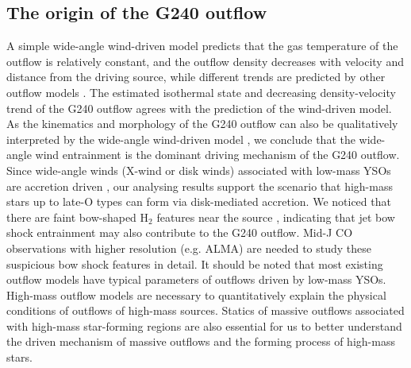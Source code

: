 
\subsection{The origin of the G240 outflow}
A simple wide-angle wind-driven model predicts that the gas temperature of the outflow is relatively constant, and the outflow density decreases with velocity and distance from the driving source, while different trends are predicted by other outflow models \citep{2007prpl.conf..245A}. The estimated isothermal state and decreasing density-velocity trend of the G240 outflow agrees with the prediction of the wind-driven model. As the kinematics and morphology of the G240 outflow can also be qualitatively interpreted by the wide-angle wind-driven model \citep{2009ApJ...696...66Q}, we conclude that the wide-angle wind entrainment is the dominant driving mechanism of the G240 outflow. Since wide-angle winds (X-wind or disk winds) associated with low-mass YSOs are accretion driven \citep{2006ApJ...649..845S, 2006MNRAS.365.1131P}, our analysing results support the scenario that high-mass stars up to late-O types can form via disk-mediated accretion. We noticed that there are faint bow-shaped H$_{2}$ features near the source  \citep{2002ApJ...576..313K}, indicating that jet bow shock entrainment may also contribute to the G240 outflow. Mid-J CO observations with higher resolution (e.g. ALMA) are needed to study these suspicious bow shock features in detail. It should be noted that most existing outflow models have typical parameters of outflows driven by low-mass YSOs. High-mass outflow models are necessary to quantitatively explain the physical conditions of outflows of high-mass sources. Statics of massive outflows associated with high-mass star-forming regions are also essential for us to better understand the driven mechanism of massive outflows and the forming process of high-mass stars.
